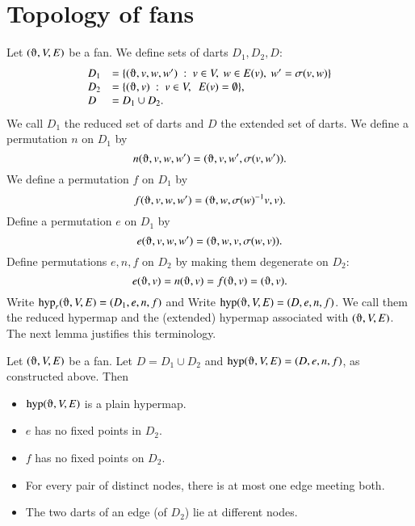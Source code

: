 \section{Topology of fans}

Let $(\orgn,V,E)$ be a fan.  We define sets of darts $D_1,D_2,D$:
    $$
    \begin{array}{lll}
    D_1 &= \{(\orgn,v,w,w')\mid v\in V,\ w\in E(v),\ w' = \sigma(v,w)\}\\
    D_2 &= \{(\orgn,v) \mid v\in V,\ \ E(v) = \emptyset\},\\
    D   &= D_1\cup D_2.
    \end{array}
    $$
We call $D_1$ the reduced set of darts and $D$ the extended set of darts.
%
We define a permutation $n$ on $D_1$ by
    $$n(\orgn,v,w,w') = (\orgn,v,w',\sigma(v,w')).$$
We define a permutation $f$ on $D_1$ by
    $$
    f (\orgn,v,w,w') = (\orgn,w,\sigma(w)^{-1} v,v).
    $$
Define a permutation $e$ on $D_1$ by
    $$
    e (\orgn,v,w,w') = (\orgn,w,v,\sigma(w,v)).
    $$
Define permutations $e,n,f$ on $D_2$ by making them degenerate on $D_2$:
    $$
    e (\orgn,v) = n(\orgn,v) = f(\orgn,v) = (\orgn,v).
    $$
Write $\op{hyp}_r(\orgn,V,E)=(D_1,e,n,f)$ and
Write $\op{hyp}(\orgn,V,E)=(D,e,n,f)$.  We call them the reduced hypermap
and the (extended) hypermap associated with $(\orgn,V,E)$.  The next
lemma justifies this terminology.



\begin{lemma} Let $(\orgn,V,E)$ be a fan.  Let $D = D_1\cup D_2$
and $\op{hyp}(\orgn,V,E) = (D,e,n,f)$, as constructed above.  Then
    \begin{itemize}
    \item $\op{hyp}(\orgn,V,E)$ is a plain hypermap.
    \item  $e$ has no fixed
points in $D_2$.
    \item  $f$ has no fixed points on $D_2$.
    \item For every pair of distinct nodes, there is at most one
    edge meeting both.
    \item The two darts of an edge (of $D_2$) lie at different nodes.
    \end{itemize}
\end{lemma}

